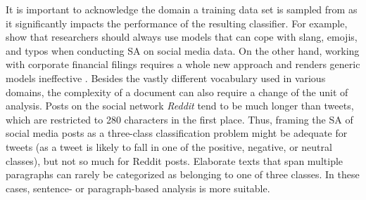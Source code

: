  It is important to acknowledge the domain a training data set is sampled from as it significantly impacts the performance of the resulting classifier. For example,  show that researchers should always use models that can cope with slang, emojis, and typos when conducting SA on social media data. On the other hand, working with corporate financial filings requires a whole new approach and renders generic models ineffective . Besides the vastly different vocabulary used in various domains, the complexity of a document can also require a change of the unit of analysis. Posts on the social network \emph{Reddit} tend to be much longer than tweets, which are restricted to 280 characters in the first place. Thus, framing the SA of social media posts as a three-class classification problem might be adequate for tweets (as a tweet is likely to fall in one of the positive, negative, or neutral classes), but not so much for Reddit posts. Elaborate texts that span multiple paragraphs can rarely be categorized as belonging to one of three classes. In these cases, sentence- or paragraph-based analysis is more suitable.
 




